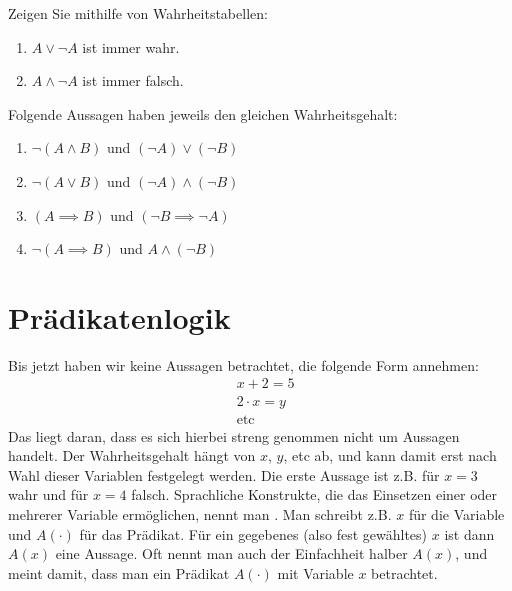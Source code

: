 \begin{exercise}
    \label{exercise-A}
    Zeigen Sie mithilfe von Wahrheitstabellen:
    \begin{enumerate}
        \item $A \lor \neg A$ ist immer wahr.
        \item $A \land \neg A$ ist immer falsch.
    \end{enumerate}
    Folgende Aussagen haben jeweils den gleichen Wahrheitsgehalt:
    \begin{enumerate}[resume]
        \item $\neg (A \land B)$ und $(\neg A) \lor (\neg B)$
        \item $\neg (A \lor B)$ und $(\neg A) \land (\neg B)$
        \item $(A \implies B)$ und $(\neg B \implies \neg A)$
        \item $\neg (A \implies B)$ und $A \land (\neg B)$
    \end{enumerate}
\end{exercise}



\section{Prädikatenlogik}

Bis jetzt haben wir keine Aussagen betrachtet, die folgende Form annehmen:
\begin{align*}
    & x + 2 = 5\\
    & 2 \cdot x = y\\
    & \text{etc}
\end{align*}
Das liegt daran, dass es sich hierbei streng genommen nicht um Aussagen handelt. Der Wahrheitsgehalt hängt von  $x$, $y$, etc ab, und kann damit erst nach Wahl dieser Variablen festgelegt werden. Die erste Aussage ist z.B. für $x=3$ wahr und für $x=4$ falsch. Sprachliche Konstrukte, die das Einsetzen einer oder mehrerer Variable ermöglichen, nennt man . Man schreibt z.B. $x$ für die Variable und $A(\cdot)$ für das Prädikat. Für ein gegebenes (also fest gewähltes) $x$ ist dann $A(x)$ eine Aussage. Oft nennt man auch der Einfachheit halber $A(x)$, und meint damit, dass man ein Prädikat $A(\cdot)$ mit Variable $x$ betrachtet.

